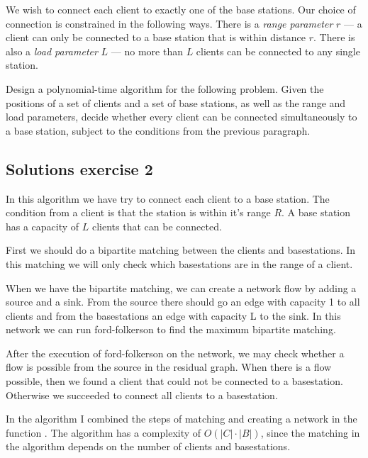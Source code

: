 \documentclass{article}
\begin{document}
We wish to connect each client to exactly one of the base stations. Our choice of connection is constrained in the following ways. There is a \emph{range parameter} $r$ --- a client can only be connected to a base station that is within distance $r$. There is also a \emph{load parameter} $L$ --- no more than $L$ clients can be connected to any single station.

Design a polynomial-time algorithm for the following problem. Given the positions of a set of clients and a set of base stations, as well as the range and load parameters, decide whether every client can be connected simultaneously to a base station, subject to the conditions from the previous paragraph.

\subsection*{Solutions exercise 2}
In this algorithm we have try to connect each client to a base station. The condition from a client is that the station is within it's range $R$. A base station has a capacity of $L$ clients that can be connected.

First we should do a bipartite matching between the clients and basestations. In this matching we will only check which basestations are in the range of a client.

When we have the bipartite matching, we can create a network flow by adding a source and a sink. From the source there should go an edge with capacity 1 to all clients and from the basestations an edge with capacity L to the sink. In this network we can run ford-folkerson to find the maximum bipartite matching.

After the execution of ford-folkerson on the network, we may check whether a flow is possible from the source in the residual graph. When there is a flow possible, then we found a client that could not be connected to a basestation. Otherwise we succeeded to connect all clients to a basestation.

In the algorithm I combined the steps of matching and creating a network in the function \createGraph{}. The algorithm has a complexity of $O(|C| \cdot |B|)$, since the matching in the algorithm depends on the number of clients and basestations.
\end{document}
